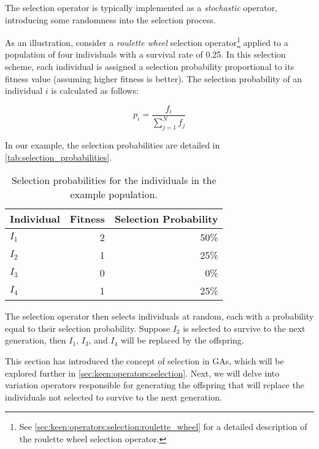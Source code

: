   The selection operator is typically implemented as a \emph{stochastic} operator, introducing some 
  randomness into the selection process.

  As an illustration, consider a \textit{roulette wheel} selection operator\footnote{
    See \vref{sec:keen:operators:selection:roulette_wheel} for a detailed description of the 
    roulette wheel selection operator.
  } applied to a population of four individuals with a survival rate of 0.25.
  In this selection scheme, each individual is assigned a selection probability proportional to its 
  fitness value (assuming higher fitness is better).
  The selection probability of an individual \(i\) is calculated as follows:

  \begin{equation}
    \label{eq:selection_probability}
    p_i = \frac{f_i}{\sum_{j=1}^{N}f_j}
  \end{equation}

  In our example, the selection probabilities are detailed in \vref{tab:selection_probabilities}.

  \begin{table}[ht!]
    \centering
    \begin{tabular}{|l|r|r|}
      \hline
      Individual  & Fitness & Selection Probability \\
      \hline
      \(I_1\)     & 2       & 50\%  \\
      \(I_2\)     & 1       & 25\%  \\
      \(I_3\)     & 0       & 0\%   \\
      \(I_4\)     & 1       & 25\%  \\
      \hline
    \end{tabular}
    \caption{Selection probabilities for the individuals in the example population.}
    \label{tab:selection_probabilities}
  \end{table}

  The selection operator then selects individuals at random, each with a probability equal to their 
  selection probability. 
  Suppose \(I_2\) is selected to survive to the next generation, then \(I_1\), \(I_3\), and \(I_4\) 
  will be replaced by the offspring.

  This section has introduced the concept of selection in GAs, which will be explored further in 
  \vref{sec:keen:operators:selection}. 
  Next, we will delve into variation operators responsible for generating the offspring that will 
  replace the individuals not selected to survive to the next generation.
%